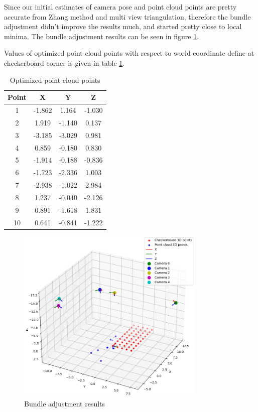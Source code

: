 \documentclass{article}
\begin{document}
Since our initial estimates of camera pose and point cloud points are pretty accurate from Zhang method and multi view triangulation, therefore the bundle adjustment didn't improve the results much, and started 
pretty close to local minima. The bundle adjustment results can be seen in figure \ref{fig:bundle_adjustment_results}.

Values of optimized point cloud points with respect to world coordinate define at checkerboard corner is given in table \ref{tab:optimized_point_cloud_points}.

\begin{table}[h]
    \centering
    \begin{tabular}{|c|c|c|c|}
    \hline
    Point & X & Y & Z \\
    \hline
    1 & -1.862 & 1.164 & -1.030 \\
    2 & 1.919 & -1.140 & 0.137 \\
    3 & -3.185 & -3.029 & 0.981 \\
    4 & 0.859 & -0.180 & 0.830 \\
    5 & -1.914 & -0.188 & -0.836 \\
    6 & -1.723 & -2.336 & 1.003 \\
    7 & -2.938 & -1.022 & 2.984 \\
    8 & 1.237 & -0.040 & -2.126 \\
    9 & 0.891 & -1.618 & 1.831 \\
    10 & 0.641 & -0.841 & -1.222 \\
    \hline
    \end{tabular}
    \caption{Optimized point cloud points}
    \label{tab:optimized_point_cloud_points}
\end{table}


\pagebreak

\begin{figure}[h]
    \centering
    \includegraphics[width=0.8\textwidth]{images/bundle_adjustment_results.png}
    \caption{Bundle adjustment results}
    \label{fig:bundle_adjustment_results}
\end{figure}
\end{document}
